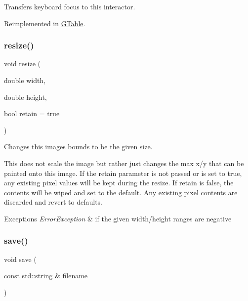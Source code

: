 Transfers keyboard focus to this interactor. 



Reimplemented in \mbox{\hyperlink{classGTable_a5921efd0a5a83eacebdadb749fb3ea7a}{G\+Table}}.

\mbox{\label{classGCanvas_a090053938117ab698c4c9c1f1cff74a9}} 
\subsubsection{\texorpdfstring{resize()}{resize()}}
{\footnotesize\ttfamily void resize (\begin{DoxyParamCaption}\item[{double}]{width,  }\item[{double}]{height,  }\item[{bool}]{retain = {\ttfamily true} }\end{DoxyParamCaption})}



Changes this image\textquotesingle{}s bounds to be the given size. 

This does not scale the image but rather just changes the max x/y that can be painted onto this image. If the \textquotesingle{}retain\textquotesingle{} parameter is not passed or is set to true, any existing pixel values will be kept during the resize. If \textquotesingle{}retain\textquotesingle{} is false, the contents will be wiped and set to the default. Any existing pixel contents are discarded and revert to defaults. 
\begin{DoxyExceptions}{Exceptions}
{\em Error\+Exception} & if the given width/height ranges are negative \\
\hline
\end{DoxyExceptions}
\mbox{\label{classGCanvas_a2c027edbcd25b820dc6e21a9a3ad0496}} 
\subsubsection{\texorpdfstring{save()}{save()}}
{\footnotesize\ttfamily void save (\begin{DoxyParamCaption}\item[{const std\+::string \&}]{filename }\end{DoxyParamCaption})\hspace{0.3cm}{\ttfamily [virtual]}}



